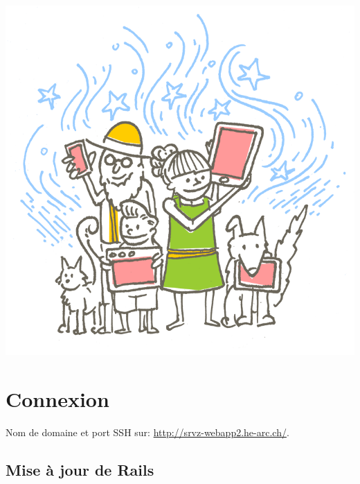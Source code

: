 \includegraphics{src/img/imagine.png}

\hypertarget{connexion}{%
\section{Connexion}\label{connexion}}

Nom de domaine et port SSH sur: \url{http://srvz-webapp2.he-arc.ch/}.

\begin{english}

\begin{Shaded}
\begin{Highlighting}[]

\NormalTok{$ }
\end{Highlighting}
\end{Shaded}

\end{english}

\hypertarget{mise-uxe0-jour-de-rails}{%
\subsection{Mise à jour de Rails}\label{mise-uxe0-jour-de-rails}}

